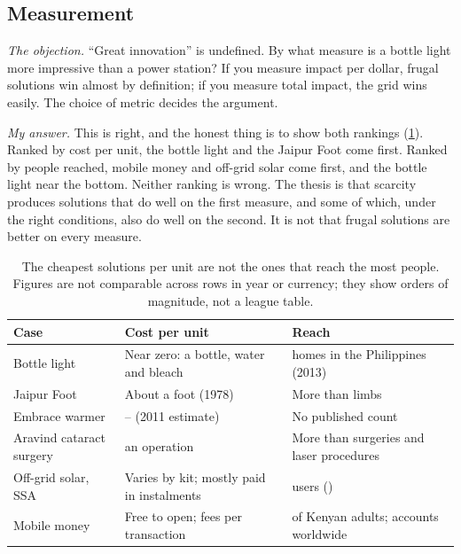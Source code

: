 \subsection{Measurement}

\emph{The objection.} ``Great innovation'' is undefined. By what measure is a
bottle light more impressive than a power station? If you measure impact per
dollar, frugal solutions win almost by definition; if you measure total impact,
the grid wins easily. The choice of metric decides the argument.

\emph{My answer.} This is right, and the honest thing is to show both rankings
(\cref{tab:measurement}). Ranked by cost per unit, the bottle light and the
Jaipur Foot come first. Ranked by people reached, mobile money and off-grid
solar come first, and the bottle light near the bottom. Neither ranking is
wrong. The thesis is that scarcity produces solutions that do well on the
first measure, and some of which, under the right conditions, also do well on
the second. It is not that frugal solutions are better on every measure.

\begin{table}[htbp]
\centering
\caption{
The cheapest solutions per unit are not the ones that reach the most people.
Figures are not comparable across rows in year or currency; they show orders of
magnitude, not a league table.}
\label{tab:measurement}
\small
\begin{tabularx}{\linewidth}{@{}l >{\raggedright\arraybackslash}X >{\raggedright\arraybackslash}X@{}}
\toprule
Case & Cost per unit & Reach \\
\midrule
Bottle light & Near zero: a bottle, water and bleach & \literHomesPhilippines{} homes in the Philippines (2013) \parencite{zobel2013bbc} \\
Jaipur Foot & About \jaipurCostOrig{} a foot (1978) \parencite{sethi1978} & More than \bmvssLimbs{} limbs \parencite{bmvss2026} \\
Embrace warmer & \embraceCostLow{}--\embraceCostHigh{} (2011 estimate) \parencite{routson2011embrace} & No published count \\
Aravind cataract surgery & \aravindCostPerOp{} an operation \parencite{le2016aravind} & More than \aravindSurgeries{} surgeries and laser procedures \parencite{ravilla2014} \\
Off-grid solar, SSA & Varies by kit; mostly paid in instalments & \sspSolarUsers{} users (\sspSolarYear{}) \parencite{irena2025offgrid} \\
Mobile money & Free to open; fees per transaction & \kenMobileMoney{} of Kenyan adults; \gsmaRegisteredAccounts{} accounts worldwide \parencite{worldbank_findex,gsma2026sotir} \\
\bottomrule
\end{tabularx}
\end{table}

